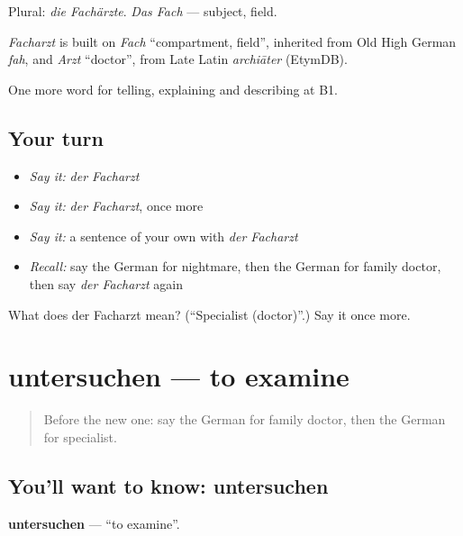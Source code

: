 Plural: \emph{die Fachärzte}. \emph{Das Fach} — subject, field.

\begin{cousinweb}
\emph{Facharzt} is built on \emph{Fach} \textquotedblleft{}compartment, field\textquotedblright{}, inherited from Old High German \emph{fah}, and \emph{Arzt} \textquotedblleft{}doctor\textquotedblright{}, from Late Latin \emph{archiāter} (EtymDB).
\end{cousinweb}

\begin{grammarlens}[title={What you've built}]
One more word for telling, explaining and describing at B1.
\end{grammarlens}

\subsection*{Your turn}
\begin{itemize}
\raggedright
  \item \emph{Say it:} \emph{der Facharzt}
  \item \emph{Say it:} \emph{der Facharzt}, once more
  \item \emph{Say it:} a sentence of your own with \emph{der Facharzt}
  \item \emph{Recall:} say the German for nightmare, then the German for family doctor, then say \emph{der Facharzt} again
\end{itemize}

\begin{tcolorbox}[breakable,colback=teal!4,colframe=teal!35!black,title={Before you move on}]
What does der Facharzt mean? (\textquotedblleft{}Specialist (doctor)\textquotedblright{}.) Say it once more.
\end{tcolorbox}
\section[untersuchen]{untersuchen — to examine}

\label{lesson:GE-C487-untersuchen}



\begin{quote}
Before the new one: say the German for family doctor, then the German for specialist.
\end{quote}

\subsection*{You'll want to know: untersuchen}
\textbf{untersuchen} — \textquotedblleft{}to examine\textquotedblright{}.

